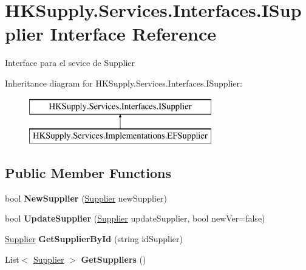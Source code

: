 \hypertarget{interface_h_k_supply_1_1_services_1_1_interfaces_1_1_i_supplier}{}\section{H\+K\+Supply.\+Services.\+Interfaces.\+I\+Supplier Interface Reference}
\label{interface_h_k_supply_1_1_services_1_1_interfaces_1_1_i_supplier}


Interface para el sevice de Supplier  


Inheritance diagram for H\+K\+Supply.\+Services.\+Interfaces.\+I\+Supplier\+:\begin{figure}[H]
\begin{center}
\leavevmode
\includegraphics[height=2.000000cm]{interface_h_k_supply_1_1_services_1_1_interfaces_1_1_i_supplier}
\end{center}
\end{figure}
\subsection*{Public Member Functions}
\begin{DoxyCompactItemize}
\item 
\mbox{\label{interface_h_k_supply_1_1_services_1_1_interfaces_1_1_i_supplier_a7019d71be0f8ed67ccc25b2904742792}} 
bool {\bfseries New\+Supplier} (\hyperlink{class_h_k_supply_1_1_models_1_1_supplier}{Supplier} new\+Supplier)
\item 
\mbox{\label{interface_h_k_supply_1_1_services_1_1_interfaces_1_1_i_supplier_a7a1efffc5b5a474eb28b018c769e744b}} 
bool {\bfseries Update\+Supplier} (\hyperlink{class_h_k_supply_1_1_models_1_1_supplier}{Supplier} update\+Supplier, bool new\+Ver=false)
\item 
\mbox{\label{interface_h_k_supply_1_1_services_1_1_interfaces_1_1_i_supplier_accc763010890f2acb72ff29919752b78}} 
\hyperlink{class_h_k_supply_1_1_models_1_1_supplier}{Supplier} {\bfseries Get\+Supplier\+By\+Id} (string id\+Supplier)
\item 
\mbox{\label{interface_h_k_supply_1_1_services_1_1_interfaces_1_1_i_supplier_a39b55b5abacb7c7b44418dc5974b3c64}} 
List$<$ \hyperlink{class_h_k_supply_1_1_models_1_1_supplier}{Supplier} $>$ {\bfseries Get\+Suppliers} ()
\end{DoxyCompactItemize}


